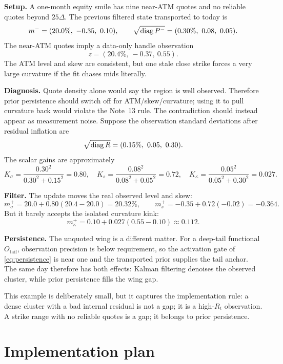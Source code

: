 \documentclass[11pt]{article}
\begin{document}
\begin{example}[title={Case file: close-strike contradiction versus true gap}]
\textbf{Setup.} A one-month equity smile has nine near-ATM quotes and no
reliable quotes beyond $25\Delta$. The previous filtered state transported to
today is
\[
m^-=(20.0\%,\ -0.35,\ 0.10),\qquad
\sqrt{\operatorname{diag} P^-}=(0.30\%,\ 0.08,\ 0.05).
\]
The near-ATM quotes imply a data-only handle observation
\[
z=(20.4\%,\ -0.37,\ 0.55).
\]
The ATM level and skew are consistent, but one stale close strike forces a very
large curvature if the fit chases mids literally.

\textbf{Diagnosis.} Quote density alone would say the region is well observed.
Therefore prior persistence should switch off for ATM/skew/curvature; using it
to pull curvature back would violate the Note~13 rule. The contradiction should
instead appear as measurement noise. Suppose the observation standard deviations
after residual inflation are
\[
\sqrt{\operatorname{diag} R}=(0.15\%,\ 0.05,\ 0.30).
\]
The scalar gains are approximately
\[
K_{\sigma}=\frac{0.30^2}{0.30^2+0.15^2}=0.80,\quad
K_s=\frac{0.08^2}{0.08^2+0.05^2}=0.72,\quad
K_\kappa=\frac{0.05^2}{0.05^2+0.30^2}=0.027.
\]

\textbf{Filter.} The update moves the real observed level and skew:
\[
m^+_\sigma=20.0+0.80(20.4-20.0)=20.32\%,\qquad
m^+_s=-0.35+0.72(-0.02)=-0.364.
\]
But it barely accepts the isolated curvature kink:
\[
m^+_\kappa=0.10+0.027(0.55-0.10)\approx0.112.
\]

\textbf{Persistence.} The unquoted wing is a different matter. For a deep-tail
functional $O_{\mathrm{tail}}$, observation precision is below requirement, so
the activation gate of \eqref{eq:persistence} is near one and the transported
prior supplies the tail anchor. The same day therefore has both effects:
Kalman filtering denoises the observed cluster, while prior persistence fills
the wing gap.
\end{example}

This example is deliberately small, but it captures the implementation rule: a
dense cluster with a bad internal residual is not a gap; it is a high-$R_t$
observation. A strike range with no reliable quotes is a gap; it belongs to
prior persistence.

\section{Implementation plan}
\label{sec:implementation}
\end{document}
